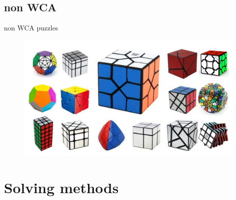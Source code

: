 \documentclass[10pt]{beamer}
\begin{document}
        \subsection{non WCA}
            \begin{frame}{non WCA puzzles}
                \begin{figure}
                    \includegraphics[width=\textwidth]{assets/nonWCAall.jpg}
                \end{figure}
            \end{frame}
        
    \section{Solving methods}
\end{document}
